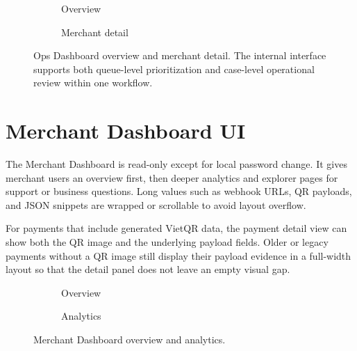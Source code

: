 \begin{figure}[!htbp]
\centering
\begin{subfigure}[t]{0.62\textwidth}
  \centering
  \caption{Overview}
\end{subfigure}
\hfill
\begin{subfigure}[t]{0.32\textwidth}
  \centering
  \caption{Merchant detail}
\end{subfigure}
\caption{Ops Dashboard overview and merchant detail. The internal interface
supports both queue-level prioritization and case-level operational review
within one workflow.}
\end{figure}

\section{Merchant Dashboard UI}

The Merchant Dashboard is read-only except for local password change. It gives
merchant users an overview first, then deeper analytics and explorer pages for
support or business questions. Long values such as webhook URLs, QR payloads,
and JSON snippets are wrapped or scrollable to avoid layout overflow.

For payments that include generated VietQR data, the payment detail view can
show both the QR image and the underlying payload fields. Older or legacy
payments without a QR image still display their payload evidence in a full-width
layout so that the detail panel does not leave an empty visual gap.

\begin{figure}[!htbp]
\centering
\begin{subfigure}{0.48\textwidth}
  \centering
  \caption{Overview}
\end{subfigure}
\hfill
\begin{subfigure}{0.48\textwidth}
  \centering
  \caption{Analytics}
\end{subfigure}
\caption{Merchant Dashboard overview and analytics.}
\end{figure}

